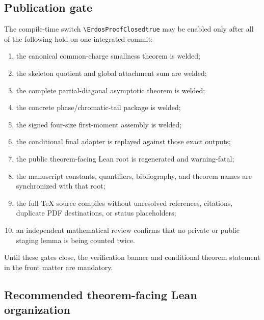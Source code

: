 \subsection{Publication gate}

The compile-time switch \verb|\ErdosProofClosedtrue| may be enabled only after
all of the following hold on one integrated commit:

\begin{enumerate}
\item the canonical common-charge smallness theorem is welded;
\item the skeleton quotient and global attachment sum are welded;
\item the complete partial-diagonal asymptotic theorem is welded;
\item the concrete phase/chromatic-tail package is welded;
\item the signed four-size first-moment assembly is welded;
\item the conditional final adapter is replayed against those exact outputs;
\item the public theorem-facing Lean root is regenerated and warning-fatal;
\item the manuscript constants, quantifiers, bibliography, and theorem names
are synchronized with that root;
\item the full TeX source compiles without unresolved references, citations,
duplicate PDF destinations, or status placeholders;
\item an independent mathematical review confirms that no private or public
staging lemma is being counted twice.
\end{enumerate}

Until these gates close, the verification banner and conditional theorem
statement in the front matter are mandatory.

\subsection{Recommended theorem-facing Lean organization}

